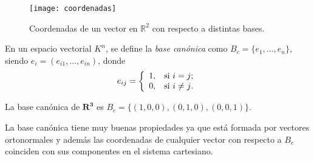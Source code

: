 \documentclass[a4paper]{article}
\begin{document}
\begin{figure}[h!]
\begin{center}
\texttt{[image: coordenadas]}
\caption{Coordenadas de un vector en $\mathbb{R}^2$ con respecto a distintas bases.}
\label{g:coordenadas}
\end{center}
\end{figure}

En un espacio vectorial $K^n$, se define la \emph{base canónica} como $B_c=\{e_1,\ldots,e_n\}$, siendo $e_i=(e_{i1},\ldots,e_{in})$, donde 
\[e_{ij}=
\left\{%
\begin{array}{ll}
    1, & \hbox{si $i=j$;} \\
    0, & \hbox{si $i\neq j$.} \\
\end{array}%
\right.    
\]

\begin{ejemplo}
La base canónica de $\mathbf{R^3}$ es $B_c=\{(1,0,0), (0,1,0), (0,0,1)\}$.
\end{ejemplo}

La base canónica tiene muy buenas propiedades ya que está formada por vectores ortonormales y además las coordenadas de cualquier vector con respecto a $B_c$ coinciden con sus componentes en el sistema cartesiano.
\end{document}
